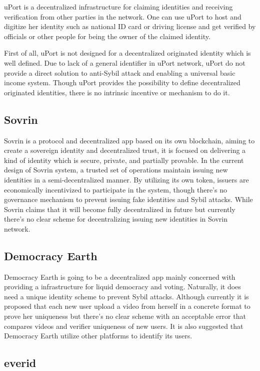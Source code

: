 \documentclass[conference]{IEEEtran}
\begin{document}
uPort is a decentralized infrastructure for claiming identities and receiving verification from other parties in the network. One can use uPort to host and digitize her identity such as national ID card or driving license and get verified by officials or other people for being the owner of the claimed identity.


 First of all, uPort is not designed for a decentralized originated identity which is well defined. Due to lack of a general identifier in uPort network, uPort do not provide a direct solution to anti-Sybil attack and enabling a universal basic income system. Though uPort provides the possibility to define decentralized originated identities, there is no intrinsic incentive or mechanism to do it.

\subsection{Sovrin}

Sovrin is a protocol and decentralized app based on its own blockchain, aiming to create a sovereign identity and decentralized trust, it is focused on delivering a kind of identity which is secure, private, and partially provable. In the current design of Sovrin system, a trusted set of operations maintain issuing new identities in a semi-decentralized manner. By utilizing its own token, issuers are economically incentivized to participate in the system, though there’s no governance mechanism to prevent issuing fake identities and Sybil attacks. While Sovrin claims that it will become fully decentralized in future but currently there’s no clear scheme for decentralizing issuing new identities in Sovrin network. 

\subsection{Democracy Earth}
Democracy Earth is going to be a decentralized app mainly concerned with providing a infrastructure for liquid democracy and voting. Naturally, it does need a unique identity scheme to prevent Sybil attacks. Although currently it is proposed that each new user upload a video from herself in a concrete format to prove her uniqueness but there’s no clear scheme with an acceptable error that compares videos and verifier uniqueness of new users. It is also suggested that Democracy Earth utilize other platforms to identify its users.
\subsection{everid}
\end{document}
